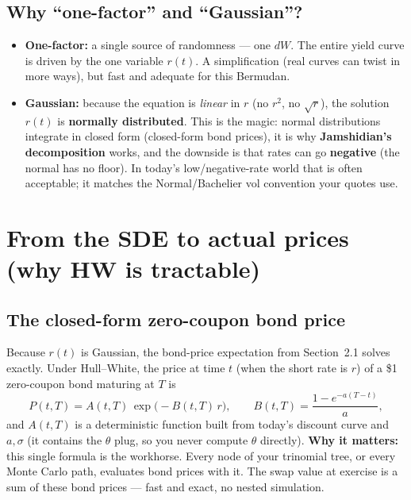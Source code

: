 \documentclass[11pt]{article}
\begin{document}
\subsection{Why ``one-factor'' and ``Gaussian''?}
\begin{itemize}[leftmargin=1.4em]
  \item \textbf{One-factor:} a single source of randomness --- one $dW$. The entire
        yield curve is driven by the one variable $r(t)$. A simplification (real curves
        can twist in more ways), but fast and adequate for this Bermudan.
  \item \textbf{Gaussian:} because the equation is \emph{linear} in $r$ (no $r^2$, no
        $\sqrt{r}$), the solution $r(t)$ is \textbf{normally distributed}. This is the
        magic: normal distributions integrate in closed form (closed-form bond prices),
        it is why \textbf{Jamshidian's decomposition} works, and the downside is that
        rates can go \textbf{negative} (the normal has no floor). In today's low/negative-rate
        world that is often acceptable; it matches the Normal/Bachelier vol convention
        your quotes use.
\end{itemize}

\section{From the SDE to actual prices (why HW is tractable)}

\subsection{The closed-form zero-coupon bond price}
Because $r(t)$ is Gaussian, the bond-price expectation from Section~2.1 solves exactly.
Under Hull--White, the price at time $t$ (when the short rate is $r$) of a \$1
zero-coupon bond maturing at $T$ is
\[
  P(t,T) = A(t,T)\,\exp\!\big(-B(t,T)\,r\big), \qquad
  B(t,T) = \frac{1 - e^{-a(T-t)}}{a},
\]
and $A(t,T)$ is a deterministic function built from today's discount curve and
$a,\sigma$ (it contains the $\theta$ plug, so you never compute $\theta$ directly).
\textbf{Why it matters:} this single formula is the workhorse. Every node of your
trinomial tree, or every Monte Carlo path, evaluates bond prices with it. The swap value
at exercise is a sum of these bond prices --- fast and exact, no nested simulation.
\end{document}
